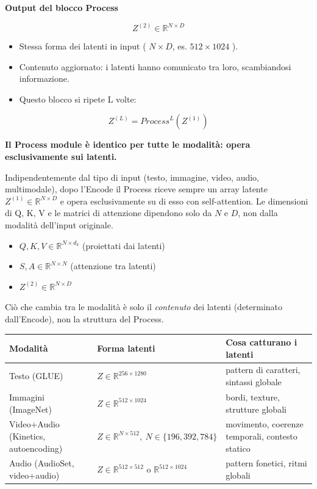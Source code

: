\documentclass[
  11pt,
]{article}
\newcounter{none} %
\begin{document}
\textbf{Output del blocco Process}

\[Z^{(2)} \in \mathbb{R}^{N \times D}\]

\begin{itemize}
\item
  Stessa forma dei latenti in input ( \(N \times D\), es.
  \(512 \times 1024\) ).
\item
  Contenuto aggiornato: i latenti hanno comunicato tra loro,
  scambiandosi informazione.
\item
  Questo blocco si ripete L volte:
\end{itemize}

\[Z^{(L)} = {Process}^{L}\left( Z^{(1)} \right)\]

\textbf{Il Process module è identico per tutte le modalità: opera esclusivamente sui latenti.}

Indipendentemente dal tipo di input (testo, immagine, video, audio, multimodale), dopo l'Encode il Process riceve sempre un array latente \(Z^{(1)} \in \mathbb{R}^{N \times D}\) e opera esclusivamente su di esso con self-attention. Le dimensioni di Q, K, V e le matrici di attenzione dipendono solo da \(N\) e \(D\), non dalla modalità dell'input originale.

\begin{itemize}
\item
  \(Q, K, V \in \mathbb{R}^{N \times d_k}\) (proiettati dai latenti)
\item
  \(S, A \in \mathbb{R}^{N \times N}\) (attenzione tra latenti)
\item
  \(Z^{(2)} \in \mathbb{R}^{N \times D}\)
\end{itemize}

Ciò che cambia tra le modalità è solo il \emph{contenuto} dei latenti (determinato dall'Encode), non la struttura del Process.

{\def\LTcaptype{none}
\begin{longtable}{@{}
  >{\raggedright\arraybackslash}p{}
  >{\raggedright\arraybackslash}p{}
  >{\raggedright\arraybackslash}p{}@{}}
\toprule\noalign{}
\textbf{Modalità} & \textbf{Forma latenti} & \textbf{Cosa catturano i latenti} \\
\midrule\noalign{}
\endhead
\bottomrule\noalign{}
\endlastfoot
Testo (GLUE) & \(Z \in \mathbb{R}^{256 \times 1280}\) & pattern di caratteri, sintassi globale \\
Immagini (ImageNet) & \(Z \in \mathbb{R}^{512 \times 1024}\) & bordi, texture, strutture globali \\
Video+Audio (Kinetics, autoencoding) & \(Z \in \mathbb{R}^{N \times 512},\ N \in \{196,392,784\}\) & movimento, coerenze temporali, contesto statico \\
Audio (AudioSet, video+audio) & \(Z \in \mathbb{R}^{512 \times 512}\) o \(\mathbb{R}^{512 \times 1024}\) & pattern fonetici, ritmi globali \\
\end{longtable}
}
\end{document}
